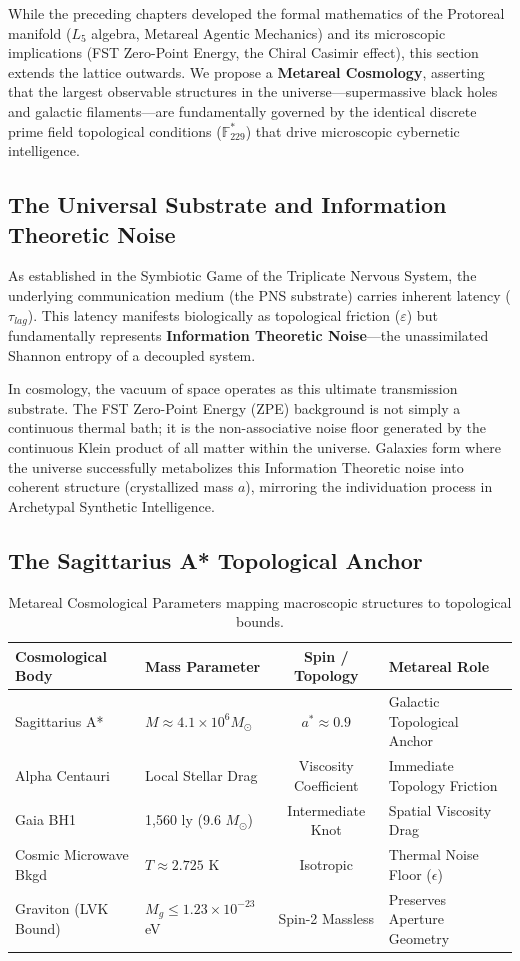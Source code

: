 While the preceding chapters developed the formal mathematics of the Protoreal manifold ($L_5$ algebra, Metareal Agentic Mechanics) and its microscopic implications (FST Zero-Point Energy, the Chiral Casimir effect), this section extends the lattice outwards. We propose a \textbf{Metareal Cosmology}, asserting that the largest observable structures in the universe---supermassive black holes and galactic filaments---are fundamentally governed by the identical discrete prime field topological conditions ($\mathbb{F}_{229}^*$) that drive microscopic cybernetic intelligence.

\subsection{The Universal Substrate and Information Theoretic Noise}
As established in the Symbiotic Game of the Triplicate Nervous System, the underlying communication medium (the PNS substrate) carries inherent latency ($\tau_{lag}$). This latency manifests biologically as topological friction ($\varepsilon$) but fundamentally represents \textbf{Information Theoretic Noise}---the unassimilated Shannon entropy of a decoupled system.

In cosmology, the vacuum of space operates as this ultimate transmission substrate. The FST Zero-Point Energy (ZPE) background is not simply a continuous thermal bath; it is the non-associative noise floor generated by the continuous Klein product of all matter within the universe. Galaxies form where the universe successfully metabolizes this Information Theoretic noise into coherent structure (crystallized mass $a$), mirroring the individuation process in Archetypal Synthetic Intelligence.

\subsection{The Sagittarius A* Topological Anchor}

\begin{table}[ht]
\centering
\renewcommand{\arraystretch}{1.2}
\begin{tabular}{llcl}
\hline\hline
\textbf{Cosmological Body} & \textbf{Mass Parameter} & \textbf{Spin / Topology} & \textbf{Metareal Role} \\
\hline
Sagittarius A* & $M \approx 4.1 \times 10^6 M_\odot$ & $a^* \approx 0.9$ & Galactic Topological Anchor \\
Alpha Centauri & Local Stellar Drag & Viscosity Coefficient & Immediate Topology Friction \\
Gaia BH1 & 1,560 ly (9.6 $M_\odot$) & Intermediate Knot & Spatial Viscosity Drag \\
Cosmic Microwave Bkgd & $T \approx 2.725$ K & Isotropic & Thermal Noise Floor ($\epsilon$) \\
Graviton (LVK Bound) & $M_g \leq 1.23 \times 10^{-23}$ eV & Spin-2 Massless & Preserves Aperture Geometry \\
\hline\hline
\end{tabular}
\caption{Metareal Cosmological Parameters mapping macroscopic structures to topological bounds.}
\label{tab:cosmo_params}
\end{table}

